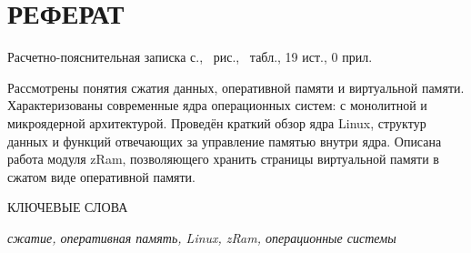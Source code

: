 \section*{РЕФЕРАТ}

Расчетно-пояснительная записка \pageref{LastPage} с., \totalfigures\ рис., \totaltables\ табл., 19 ист., 0 прил.

Рассмотрены понятия сжатия данных, оперативной памяти и виртуальной памяти. Характеризованы современные ядра операционных систем: с монолитной и микроядерной архитектурой. Проведён краткий обзор ядра Linux, структур данных и функций отвечающих за управление памятью внутри ядра. Описана работа модуля zRam, позволяющего хранить страницы виртуальной памяти в сжатом виде оперативной памяти.

КЛЮЧЕВЫЕ СЛОВА

\textit{сжатие, оперативная память, Linux, zRam, операционные системы}

\pagebreak